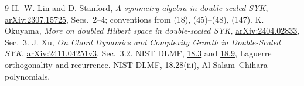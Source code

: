 \documentclass[11pt]{article}
\begin{document}
\begin{thebibliography}{9}
 H.~W. Lin and D. Stanford,
\emph{A symmetry algebra in double-scaled SYK},
\href{https://arxiv.org/abs/2307.15725}{arXiv:2307.15725},
Secs.~2--4; conventions from (18), (45)--(48), (147).
 K. Okuyama, \emph{More on doubled Hilbert space
in double-scaled SYK},
\href{https://arxiv.org/abs/2404.02833}{arXiv:2404.02833}, Sec.~3.
 J. Xu, \emph{On Chord Dynamics and Complexity Growth
in Double-Scaled SYK},
\href{https://arxiv.org/abs/2411.04251v3}{arXiv:2411.04251v3}, Sec.~3.2.
 NIST DLMF,
\href{https://dlmf.nist.gov/18.3}{18.3} and
\href{https://dlmf.nist.gov/18.9}{18.9}, Laguerre orthogonality and recurrence.
 NIST DLMF,
\href{https://dlmf.nist.gov/18.28}{18.28(iii)}, Al-Salam--Chihara polynomials.
\end{thebibliography}
\end{document}

